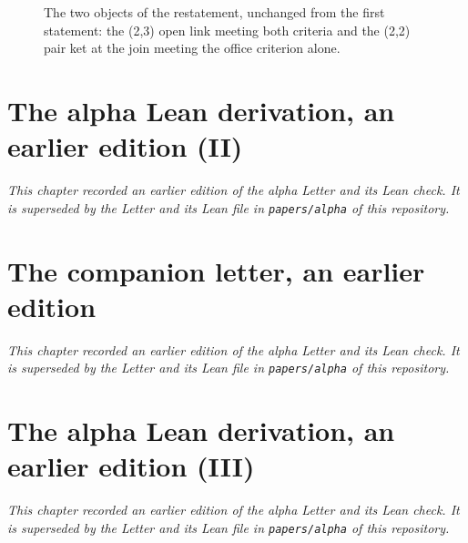 \begin{chproof}
\begin{figure}[h]\centering{}\caption{The two objects of the restatement, unchanged from the first statement: the (2,3) open link meeting both criteria and the (2,2) pair ket at the join meeting the office criterion alone.}\end{figure}
\end{chproof}
\section{The alpha Lean derivation, an earlier edition (II)}\label{mod:V-1-D541978-lnat-t1}
\par\noindent\textit{This chapter recorded an earlier edition of the alpha Letter and its Lean check. It is superseded by the Letter and its Lean file in \texttt{papers/alpha} of this repository.}\par
\section{The companion letter, an earlier edition}\label{mod:V-1-D542270-alpha-letter-release-thirty-nine}
\par\noindent\textit{This chapter recorded an earlier edition of the alpha Letter and its Lean check. It is superseded by the Letter and its Lean file in \texttt{papers/alpha} of this repository.}\par
\section{The alpha Lean derivation, an earlier edition (III)}\label{mod:V-1-D542692-ldrf-t1}
\par\noindent\textit{This chapter recorded an earlier edition of the alpha Letter and its Lean check. It is superseded by the Letter and its Lean file in \texttt{papers/alpha} of this repository.}\par
